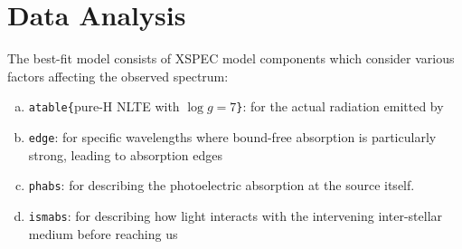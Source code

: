 \section{Data Analysis} \label{sec:analysis}
	The best-fit model consists of XSPEC model components which consider various factors affecting the observed spectrum:
    \begin{enumerate}[a)]
   		\item \texttt{atable\{}pure-H NLTE with $\log{g}=7$\texttt{\}}: for the actual radiation emitted by \source
   		\item \texttt{edge}: for specific wavelengths where bound-free absorption is particularly strong, leading to absorption edges
   		\item \texttt{phabs}: for describing the photoelectric absorption at the source itself.
   		\item \texttt{ismabs}: for describing how light interacts with the intervening inter-stellar medium before reaching us
   	\end{enumerate}